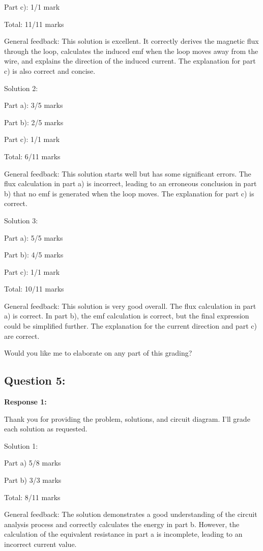 \documentclass[a4paper,11pt]{article}
\begin{document}
Part c): 1/1 mark

Total: 11/11 marks

General feedback: This solution is excellent. It correctly derives the magnetic flux through the loop, calculates the induced emf when the loop moves away from the wire, and explains the direction of the induced current. The explanation for part c) is also correct and concise.

Solution 2:

Part a): 3/5 marks

Part b): 2/5 marks

Part c): 1/1 mark

Total: 6/11 marks

General feedback: This solution starts well but has some significant errors. The flux calculation in part a) is incorrect, leading to an erroneous conclusion in part b) that no emf is generated when the loop moves. The explanation for part c) is correct.

Solution 3:

Part a): 5/5 marks

Part b): 4/5 marks

Part c): 1/1 mark

Total: 10/11 marks

General feedback: This solution is very good overall. The flux calculation in part a) is correct. In part b), the emf calculation is correct, but the final expression could be simplified further. The explanation for the current direction and part c) are correct.

Would you like me to elaborate on any part of this grading?

\subsection*{Question 5:}

\textbf{Response 1:}

Thank you for providing the problem, solutions, and circuit diagram. I'll grade each solution as requested.

Solution 1:

Part a) 5/8 marks

Part b) 3/3 marks

Total: 8/11 marks

General feedback: The solution demonstrates a good understanding of the circuit analysis process and correctly calculates the energy in part b. However, the calculation of the equivalent resistance in part a is incomplete, leading to an incorrect current value.
\end{document}
